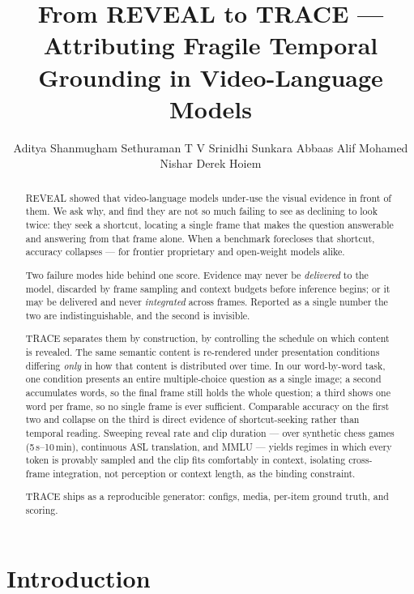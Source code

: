 \documentclass{article}
\title{From REVEAL to TRACE --- Attributing Fragile Temporal\\ Grounding in
Video-Language Models}
\author{%
  Aditya Shanmugham
  \And
  Sethuraman T V
  \And
  Srinidhi Sunkara
  \AND
  Abbaas Alif Mohamed Nishar
  \And
  Derek Hoiem
}
\begin{document}
\maketitle

\begin{abstract}
REVEAL showed that video-language models under-use the visual evidence in front
of them. We ask why, and find they are not so much failing to see as declining to
look twice: they seek a shortcut, locating a single frame that makes the question
answerable and answering from that frame alone. When a benchmark forecloses that
shortcut, accuracy collapses --- for frontier proprietary and open-weight models
alike.

Two failure modes hide behind one score. Evidence may never be \emph{delivered}
to the model, discarded by frame sampling and context budgets before inference
begins; or it may be delivered and never \emph{integrated} across frames.
Reported as a single number the two are indistinguishable, and the second is
invisible.

TRACE separates them by construction, by controlling the schedule on which
content is revealed. The same semantic content is re-rendered under presentation
conditions differing \emph{only} in how that content is distributed over time. In
our word-by-word task, one condition presents an entire multiple-choice question
as a single image; a second accumulates words, so the final frame still holds the
whole question; a third shows one word per frame, so no single frame is ever
sufficient. Comparable accuracy on the first two and collapse on the third is
direct evidence of shortcut-seeking rather than temporal reading. Sweeping reveal
rate and clip duration --- over synthetic chess games (5\,s--10\,min), continuous
ASL translation, and MMLU --- yields regimes in which every token is provably
sampled and the clip fits comfortably in context, isolating cross-frame
integration, not perception or context length, as the binding constraint.

TRACE ships as a reproducible generator: configs, media, per-item ground truth,
and scoring.
\end{abstract}

\section{Introduction}
\end{document}
